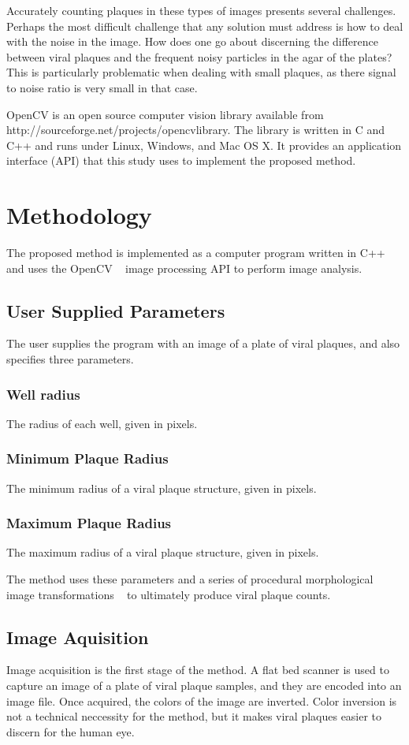 \documentclass[11pt,final,twocolumn]{IEEEtran}
\begin{document}
Accurately counting plaques in these types of images presents several challenges. Perhaps the most difficult challenge that any solution must address is how to deal with the noise in the image.  How does one go about discerning the difference between viral plaques and the frequent noisy particles in the agar of the plates?  This is particularly problematic when dealing with small plaques, as there signal to noise ratio is very small in that case.  

OpenCV is an open source computer vision library available from http://sourceforge.net/projects/opencvlibrary. The library is written in C and C++ and runs under Linux, Windows, and Mac OS X. It provides an application interface (API) that this study uses to implement the proposed method. 


\section{Methodology}
The proposed method is implemented as a computer program written in C++ and uses the  OpenCV ~\cite{openCV} image processing API to perform image analysis. 

\subsection{User Supplied Parameters}
The user supplies the program with an image of a plate of viral plaques, and also specifies three parameters.
\subsubsection{Well radius}
The radius of each well, given in pixels.

\subsubsection{Minimum Plaque Radius}
 The minimum radius of a viral plaque structure, given in pixels.

\subsubsection{Maximum Plaque Radius}
 The maximum radius of a viral plaque structure, given in pixels.


The method uses these parameters and a series of procedural morphological image transformations ~\cite{morphological} to ultimately produce viral plaque counts.

\subsection{Image Aquisition}
Image acquisition  is the first stage of the method. A flat bed scanner is used to capture an image of a plate of viral plaque samples, and they are encoded into an image file. Once acquired, the colors of the image are inverted. Color inversion is not a technical neccessity for the method, but it makes viral plaques easier to discern for the human eye.
\end{document}
